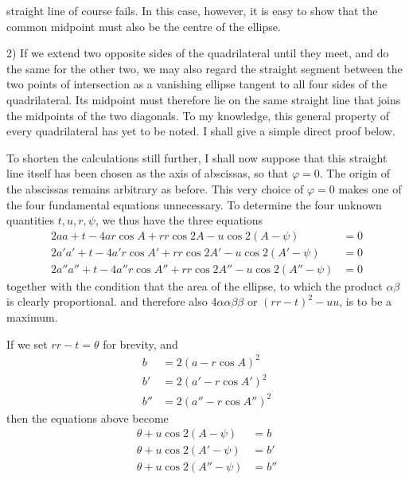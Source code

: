 %
straight line of course fails. In this case, however, it is easy to show that the common midpoint must also be the centre of the ellipse.

2) If we extend two opposite sides of the quadrilateral until they meet, and do the same for the other two, we may also regard the straight segment between the two points of intersection as a vanishing ellipse tangent to all four sides of the quadrilateral. Its midpoint must therefore lie on the same straight line that joins the midpoints of the two diagonals. To my knowledge, this general property of every quadrilateral has yet to be noted. I shall give a simple direct proof below.

To shorten the calculations still further, I shall now suppose that this straight line itself has been chosen as the axis of abscissas, so that \(\varphi=0\). The origin of the abscissas remains arbitrary as before. This very choice of \(\varphi=0\) makes one of the four fundamental equations unnecessary. To determine the four unknown quantities \(t,u,r,\psi\), we thus have the three equations
\[
\begin{aligned}
2aa+t-4ar\cos A+rr\cos2A-u\cos2(A-\psi)&=0\\
2a'a'+t-4a'r\cos A'+rr\cos2A'-u\cos2(A'-\psi)&=0\\
2a''a''+t-4a''r\cos A''+rr\cos2A''-u\cos2(A''-\psi)&=0
\end{aligned}
\]
together with the condition that the area of the ellipse, to which the product \(\alpha\beta\) is clearly proportional. and therefore also \(4\alpha\alpha\beta\beta\) or \((rr-t)^2-uu\), is to be a maximum.

If we set \(rr-t=\theta\) for brevity, and
\[
\begin{aligned}
b&=2(a-r\cos A)^2\\
b'&=2(a'-r\cos A')^2\\
b''&=2(a''-r\cos A'')^2
\end{aligned}
\]
then the equations above become
\[
\begin{aligned}
\theta+u\cos2(A-\psi)&=b\\
\theta+u\cos2(A'-\psi)&=b'\\
\theta+u\cos2(A''-\psi)&=b''
\end{aligned}
\]
